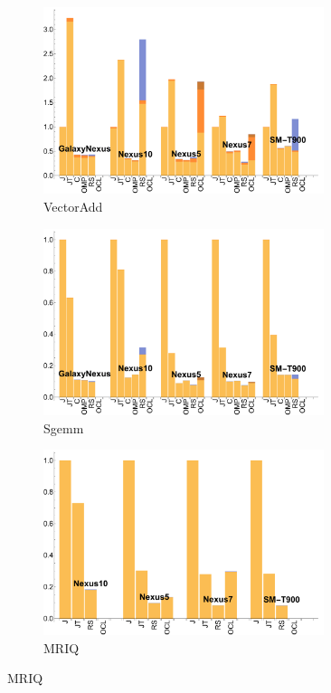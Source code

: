 \begin{figure}
  \begin{subfigure}[b]{0.33\textwidth}
      \centering
      \includegraphics[width=0.9\textwidth]{data/VectorAdd_time.pdf}
      \caption{VectorAdd}
  \end{subfigure}
  \begin{subfigure}[b]{0.33\textwidth}
      \centering
      \includegraphics[width=0.9\textwidth]{data/Sgemm_time.pdf}
      \caption{Sgemm}
  \end{subfigure}
  \begin{subfigure}[b]{0.33\textwidth}
      \centering
      \includegraphics[width=0.9\textwidth]{data/Mriq_time.pdf}
      \caption{MRIQ}
  \end{subfigure}


\end{figure}
